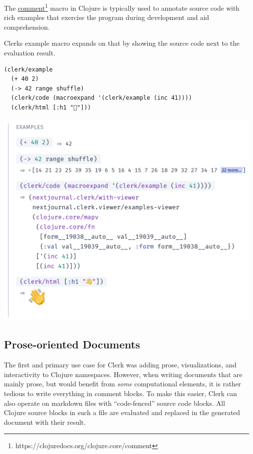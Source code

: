 \documentclass[sigconf,screen]{acmart}
\begin{document}
The {\href{https://clojuredocs.org/clojure.core/comment}{comment}\footnote{https://clojuredocs.org/clojure.core/comment}} macro in Clojure is typically used to annotate source code with rich examples that exercise the program during development and aid comprehension.

Clerk\textquotesingle s example macro expands on that by showing the source code next to the evaluation result.

\begin{minipage}{\linewidth}
\begin{lstlisting}
(clerk/example
  (+ 40 2)
  (-> 42 range shuffle)
  (clerk/code (macroexpand '(clerk/example (inc 41))))
  (clerk/html [:h1 "👋"]))
\end{lstlisting}
\end{minipage}

\includegraphics{images/anon-expr-5dtPQwixfSw57U4Tdiwqwrsj2tVHu1-result.png}

\hypertarget{prose-oriented-documents}{%
\subsection{Prose-oriented Documents}\label{prose-oriented-documents}}

The first and primary use case for Clerk was adding prose, visualizations, and interactivity to Clojure namespaces. However, when writing documents that are mainly prose, but would benefit from \emph{some} computational elements, it is rather tedious to write everything in comment blocks. To make this easier, Clerk can also operate on markdown files with ``code-fenced'' source code blocks. All Clojure source blocks in such a file are evaluated and replaced in the generated document with their result.
\end{document}
